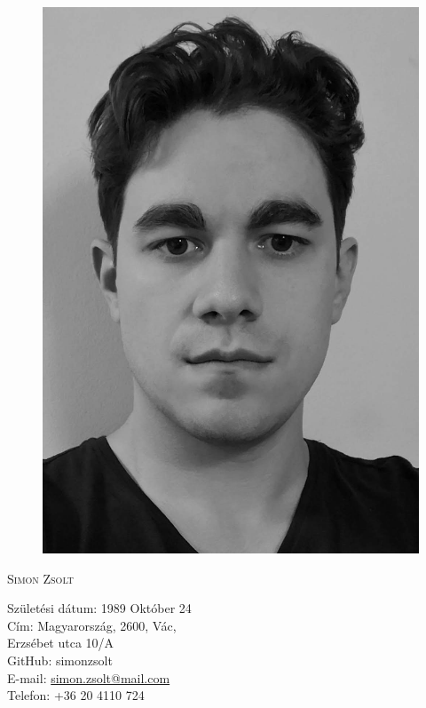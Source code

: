 

\setlength{\parindent}{0em}

\def \leftHeader{CV}
\def \rightHeader{Simon Zsolt}

\setmainfont[Mapping=tex-text,Numbers=OldStyle,Ligatures=TeX]{TeX Gyre Termes}



\begin{figure}
  \flushright
  \includegraphics[scale=0.4]{portrait_mono} 
\end{figure}

\begin{Large}
  \textsc{Simon Zsolt}
  \vspace{1em}
\end{Large}

Születési dátum: 1989 Október 24\\
Cím: Magyarország, 2600, Vác,\\ \hspace*{1em} Erzsébet utca 10/A\\ 
GitHub: simonzsolt\\
E-mail: \url{simon.zsolt@mail.com}\\
Telefon: +36 20 4110 724

